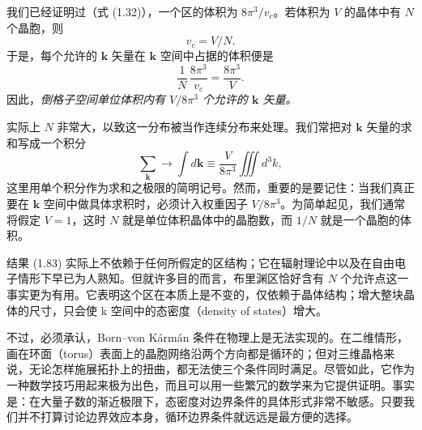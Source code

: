 我们已经证明过（式 (1.32)），一个区的体积为 $8\pi^3/v_c$。若体积为 $V$ 的晶体中有 $N$ 个晶胞，则
\begin{equation*}
v_c=V/N.
\tag{1.82}
\end{equation*}
于是，每个允许的 $\mathbf{k}$ 矢量在 $\mathbf{k}$ 空间中占据的体积便是
\begin{equation*}
\frac{1}{N}\,\frac{8\pi^3}{v_c}=\frac{8\pi^3}{V}.
\tag{1.83}
\end{equation*}
因此，\emph{倒格子空间单位体积内有 $V/8\pi^3$ 个允许的 $\mathbf{k}$ 矢量。}

实际上 $N$ 非常大，以致这一分布被当作连续分布来处理。我们常把对 $\mathbf{k}$ 矢量的求和写成一个积分
\begin{equation*}
\sum_{\mathbf{k}}\rightarrow\int d\mathbf{k}\equiv\frac{V}{8\pi^3}\iiint d^3k,
\tag{1.84}
\end{equation*}
这里用单个积分作为求和之极限的简明记号。然而，重要的是要记住：当我们真正要在 $\mathbf{k}$ 空间中做具体求积时，必须计入权重因子 $V/8\pi^3$。为简单起见，我们通常将假定 $V=1$，这时 $N$ 就是单位体积晶体中的晶胞数，而 $1/N$ 就是一个晶胞的体积。

结果 (1.83) 实际上不依赖于任何所假定的区结构；它在辐射理论中以及在自由电子情形下早已为人熟知。但就许多目的而言，布里渊区恰好含有 $N$ 个允许点这一事实更为有用。它表明这个区在本质上是不变的，仅依赖于晶体结构；增大整块晶体的尺寸，只会使 k 空间中的态密度（density of states）增大。

不过，必须承认，Born–von Kármán 条件在物理上是无法实现的。在二维情形，画在环面（torus）表面上的晶胞网络沿两个方向都是循环的；但对三维晶格来说，无论怎样施展拓扑上的扭曲，都无法使三个条件同时满足。尽管如此，它作为一种数学技巧用起来极为出色，而且可以用一些繁冗的数学来为它提供证明。事实是：在大量子数的渐近极限下，态密度对边界条件的具体形式非常不敏感。只要我们并不打算讨论边界效应本身，循环边界条件就远远是最方便的选择。
